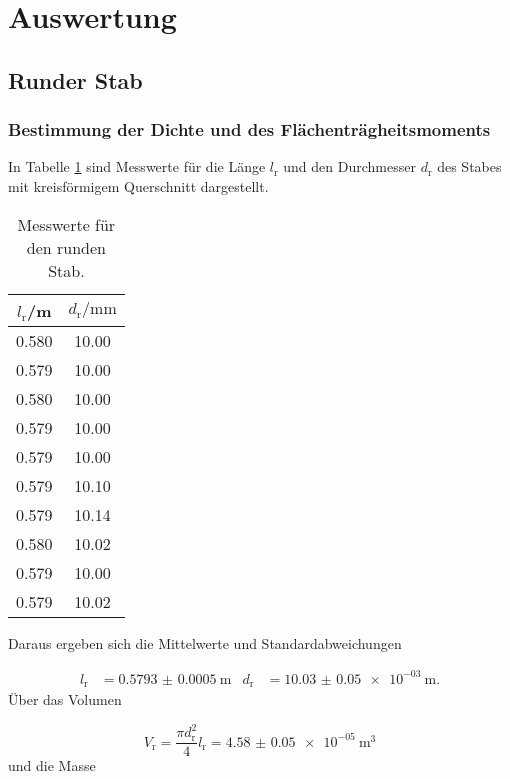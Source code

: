 \section{Auswertung}
\label{sec:Auswertung}

\subsection{Runder Stab}

\subsubsection{Bestimmung der Dichte und des Flächenträgheitsmoments}

In Tabelle \ref{tab:Dichterund} sind Messwerte für die Länge $l_\text{r}$ und
den Durchmesser $d_\text{r}$ des Stabes mit
kreisförmigem Querschnitt dargestellt.

\begin{table}[H]
  \centering
  \caption{Messwerte für den runden Stab.}
  \label{tab:Dichterund}
  \begin{tabular}{c c}
    \toprule
    $l_\text{r}$/\si{\meter} & $d_\text{r}/\si{\milli\meter}$ \\
    \midrule
    0.580 & 10.00 \\
    0.579 & 10.00 \\
    0.580 & 10.00 \\
    0.579 & 10.00 \\
    0.579 & 10.00 \\
    0.579 & 10.10 \\
    0.579 & 10.14 \\
    0.580 & 10.02 \\
    0.579 & 10.00 \\
    0.579 & 10.02 \\
    \bottomrule
  \end{tabular}
\end{table}

Daraus ergeben sich die Mittelwerte und Standardabweichungen

\begin{align}
  l_\text{r} & = \SI{0.5793(5)}{\meter} & d_\text{r} & = \SI{10.03(5)e-03}{\meter}.
\end{align}
Über das Volumen

\begin{equation}
  V_\text{r} = \frac{\pi d_\text{r}^2}{4} l_\text{r} = \SI{4.58(5)e-05}{\cubic\meter}
\end{equation}
und die Masse

